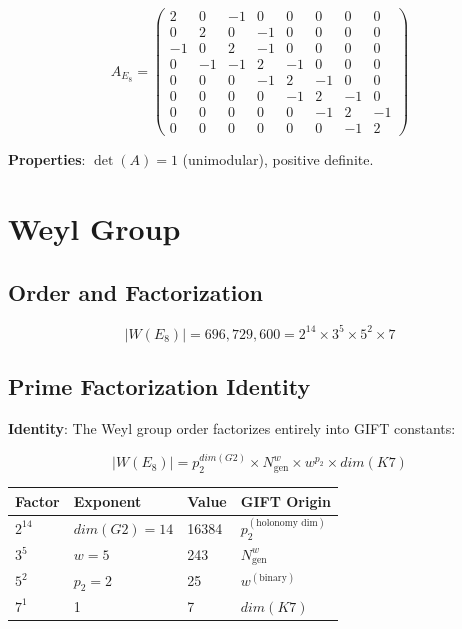 \documentclass[11pt,a4paper]{article}
\newcommand{\E}{\mathrm{E}}
\newcommand{\Gtwo}{\mathrm{G}_2}
\newcommand{\Kseven}{K_7}
\newcommand{\dimE}{\mathrm{dim}}
\def\Gtwo{G2}%
\def\Kseven{K7}%
\def\E{E}%
\def\dimE{dim}%
\begin{document}
$$A_{\E_8} = \begin{pmatrix}
2 & 0 & -1 & 0 & 0 & 0 & 0 & 0 \\
0 & 2 & 0 & -1 & 0 & 0 & 0 & 0 \\
-1 & 0 & 2 & -1 & 0 & 0 & 0 & 0 \\
0 & -1 & -1 & 2 & -1 & 0 & 0 & 0 \\
0 & 0 & 0 & -1 & 2 & -1 & 0 & 0 \\
0 & 0 & 0 & 0 & -1 & 2 & -1 & 0 \\
0 & 0 & 0 & 0 & 0 & -1 & 2 & -1 \\
0 & 0 & 0 & 0 & 0 & 0 & -1 & 2
\end{pmatrix}$$

\textbf{Properties}: $\det(A) = 1$ (unimodular), positive definite.

\section{Weyl Group}

\subsection{Order and Factorization}

$$|W(\E_8)| = 696{,}729{,}600 = 2^{14} \times 3^5 \times 5^2 \times 7$$

\subsection{Prime Factorization Identity}

\textbf{Identity}: The Weyl group order factorizes entirely into GIFT constants:

$$|W(\E_8)| = p_2^{\dimE(\Gtwo)} \times N_{\mathrm{gen}}^{w} \times w^{p_2} \times \dimE(\Kseven)$$

\begin{table}[H]
\centering
\begin{tabular}{llll}
\toprule
Factor & Exponent & Value & GIFT Origin \\
\midrule
$2^{14}$ & $\dimE(\Gtwo) = 14$ & 16384 & $p_2^{(\text{holonomy dim})}$ \\
$3^5$ & $w = 5$ & 243 & $N_{\mathrm{gen}}^w$ \\
$5^2$ & $p_2 = 2$ & 25 & $w^{(\text{binary})}$ \\
$7^1$ & 1 & 7 & $\dimE(\Kseven)$ \\
\bottomrule
\end{tabular}
\end{table}
\end{document}
